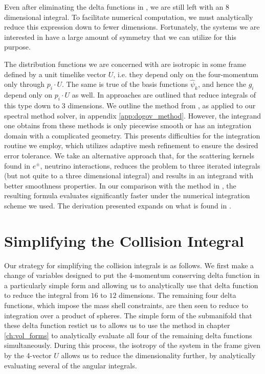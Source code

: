 Even after eliminating the delta functions in , we are still left with an $8$ dimensional integral.  To facilitate numerical computation, we must analytically reduce this expression down to fewer dimensions.  Fortunately, the systems we are interested in have a large amount of symmetry that we can utilize for this purpose.  

The distribution functions we are concerned with are isotropic in some frame defined  by a unit timelike vector $U$, i.e. they depend only on the four-momentum only through $p_i\cdot U$.  The same is true of the basis functions $\hat\psi_k$, and hence the  $g_i$ depend only on $p_i\cdot U$ as well.  In \cite{Madsen,Dolgov_Hansen} approaches are outlined that reduce integrals of this type down to $3$ dimensions.  We outline the method from \cite{Dolgov_Hansen}, as applied to our spectral method solver, in appendix \ref{app:dogov_method}.  However, the integrand one obtains from these methods is only piecewise smooth or has an integration domain with a complicated geometry.  This presents difficulties for the integration routine we employ, which utilizes adaptive mesh refinement to ensure the desired error tolerance.  We take an alternative approach that, for the scattering kernels found in $e^\pm$, neutrino interactions, reduces the problem to three iterated integrals (but not quite to a three dimensional integral) and results in an integrand with better smoothness properties.  In our comparison with the method in \cite{Dolgov_Hansen}, the resulting formula evaluates significantly faster under the numerical integration scheme we used.   The derivation presented expands on what is found in \cite{letessier2002hadrons}.

\section{Simplifying the Collision Integral}\label{coll_simp_sec}
Our strategy for simplifying the collision integrals is as follows.  We first make a change of variables designed to put the 4-momentum conserving delta function in a particularly simple form and allowing us to analytically use that delta function to reduce the integral from $16$ to $12$ dimensions.  The remaining four delta functions, which impose the mass shell constraints, are then seen to reduce to integration over a product of spheres.  The simple form of the submanifold that these delta function restict us to allows us to use the method in chapter \ref{ch:vol_forms} to analytically evaluate all four of the remaining delta functions simultaneously.  During this process, the isotropy of the system in the frame given by the 4-vector $U$ allows us to reduce the dimensionality further, by analytically evaluating several of the angular integrals. 

